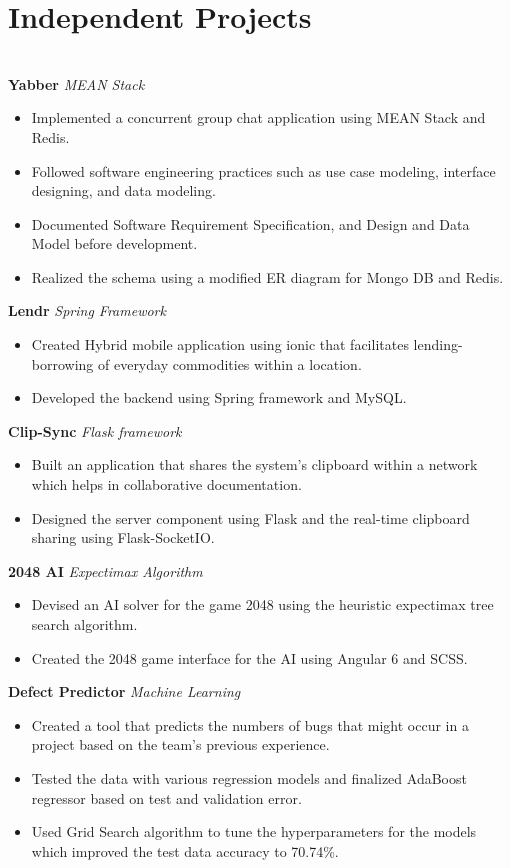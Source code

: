 \documentclass{resume}
\begin{document}
\section*{Independent Projects}
\titlerule
\noindent
\\
\textbf{Yabber} \hfill \textit{MEAN Stack}
\begin{itemize}
  \item Implemented a concurrent group chat application using MEAN Stack and Redis.
  \item Followed software engineering practices such as use case modeling, interface designing, and data modeling.
  \item Documented Software Requirement Specification, and Design and Data Model before development.
  \item Realized the schema using a modified ER diagram for Mongo DB and Redis.
\end{itemize}
\textbf{Lendr} \hfill \textit{Spring Framework}
\begin{itemize}
  \item Created Hybrid mobile application using ionic that facilitates lending-borrowing of everyday commodities within a location.
  \item Developed the backend using Spring framework and MySQL.
\end{itemize}
\textbf{Clip-Sync} \hfill \textit{Flask framework}
\begin{itemize}
  \item Built an application that shares the system's clipboard within a network which helps in collaborative documentation. 
  \item Designed the server component using Flask and the real-time clipboard sharing using Flask-SocketIO.
\end{itemize}
\textbf{2048 AI} \hfill \textit{Expectimax Algorithm}
\begin{itemize}
  \item Devised an AI solver for the game 2048 using the heuristic expectimax tree search algorithm.
  \item Created the 2048 game interface for the AI using Angular 6 and SCSS.
\end{itemize}
\textbf{Defect Predictor} \hfill \textit{Machine Learning}
\begin{itemize}
  \item Created a tool that predicts the numbers of bugs that might occur in a project based on the team's previous experience.
  \item Tested the data with various regression models and finalized AdaBoost regressor based on test and validation error.
  \item Used Grid Search algorithm to tune the hyperparameters for the models which improved the test data accuracy to 70.74\%.
\end{itemize}
\end{document}
